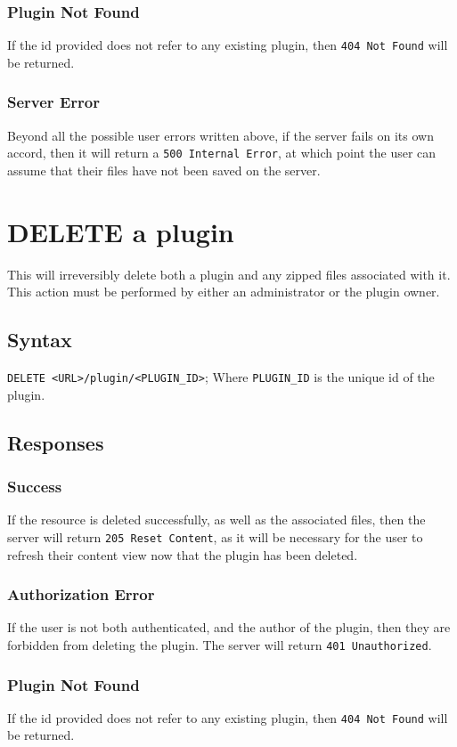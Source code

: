 \documentclass[a4paper, 12pt]{article}
\begin{document}
			\subsubsection{Plugin Not Found}
				If the id provided does not refer to any existing plugin, then \verb|404 Not Found| will be returned.

			\subsubsection{Server Error}
				Beyond all the possible user errors written above, if the server fails on its own accord, then it will return a \verb|500 Internal Error|, at which point the user can assume that their files have not been saved on the server.

	\section{DELETE a plugin}
		This will irreversibly delete both a plugin and any zipped files associated with it. This action must be performed by either an administrator or the plugin owner.

		\subsection{Syntax}
			\verb|DELETE <URL>/plugin/<PLUGIN_ID>|; \footnotesize{Where \verb|PLUGIN_ID| is the unique id of the plugin.}

		\subsection{Responses}
			\subsubsection{Success}
				If the resource is deleted successfully, as well as the associated files, then the server will return \verb|205 Reset Content|, as it will be necessary for the user to refresh their content view now that the plugin has been deleted.

			\subsubsection{Authorization Error}
				If the user is not both authenticated, and the author of the plugin, then they are forbidden from deleting the plugin. The server will return \verb|401 Unauthorized|.

			\subsubsection{Plugin Not Found}
				If the id provided does not refer to any existing plugin, then \verb|404 Not Found| will be returned.
\end{document}
